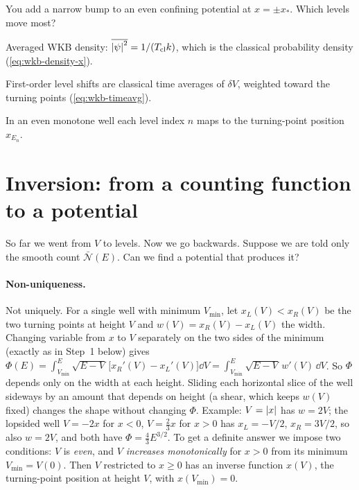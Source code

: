\begin{checkpoint}
You add a narrow bump to an even confining potential at $x=\pm x_*$. Which levels move most?
\end{checkpoint}

\begin{keyideas}
\item Averaged WKB density: $\overline{\left\lvert \psi\right\rvert^2}=1/(T_{\rm cl}k)$, which is the classical probability density (\cref{eq:wkb-density-x}).
\item First-order level shifts are classical time averages of $\delta V$, weighted toward the turning points (\cref{eq:wkb-timeavg}).
\item In an even monotone well each level index $n$ maps to the turning-point position $x_{E_n}$.
\end{keyideas}

\section{Inversion: from a counting function to a potential}\label{sec:wkb-abel}

So far we went from $V$ to levels. Now we go backwards. Suppose we are told only the smooth count $\bar{\mathcal N}(E)$. Can we find a potential that produces it?

\paragraph{Non-uniqueness.} Not uniquely. For a single well with minimum $V_{\min}$, let $x_L(V)<x_R(V)$ be the two turning points at height $V$ and $w(V)=x_R(V)-x_L(V)$ the width. Changing variable from $x$ to $V$ separately on the two sides of the minimum (exactly as in Step~1 below) gives $\Phi(E)=\int_{V_{\min}}^{E}\sqrt{E-V}\,\bigl[x_R'(V)-x_L'(V)\bigr]\dd V=\int_{V_{\min}}^{E}\sqrt{E-V}\,w'(V)\,\dd V$. So $\Phi$ depends only on the width at each height. Sliding each horizontal slice of the well sideways by an amount that depends on height (a shear, which keeps $w(V)$ fixed) changes the shape without changing $\Phi$. Example: $V=\left\lvert x\right\rvert$ has $w=2V$; the lopsided well $V=-2x$ for $x<0$, $V=\tfrac23x$ for $x>0$ has $x_L=-V/2$, $x_R=3V/2$, so also $w=2V$, and both have $\Phi=\tfrac43E^{3/2}$. To get a definite answer we impose two conditions: $V$ is \emph{even}, and $V$ \emph{increases monotonically} for $x>0$ from its minimum $V_{\min}=V(0)$. Then $V$ restricted to $x\ge0$ has an inverse function $x(V)$, the turning-point position at height $V$, with $x(V_{\min})=0$.

